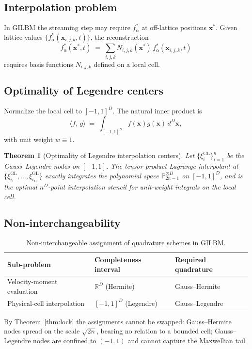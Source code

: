 \documentclass[11pt,a4paper]{article}
\newtheorem{theorem}{Theorem}[section]
\theoremstyle{definition}
\newcommand{\R}{\mathbb{R}}
\newcommand{\PP}{\mathbb{P}}
\newcommand{\ip}[2]{\langle #1,\, #2 \rangle}
\newcommand{\GL}{\mathrm{GL}}
\begin{document}
\subsection{Interpolation problem}

In GILBM the streaming step may require $f_\alpha^*$ at off-lattice positions
$\bm{x}^*$. Given lattice values $\{f_\alpha^*(\bm{x}_{i,j,k},t)\}$, the
reconstruction
\[
  f_\alpha^*(\bm{x}^*,t)
  \;=\;\sum_{i,j,k} N_{i,j,k}(\bm{x}^*)\,f_\alpha^*(\bm{x}_{i,j,k},t)
\]
requires basis functions $N_{i,j,k}$ defined on a local cell.

\subsection{Optimality of Legendre centers}

Normalize the local cell to $[-1,1]^D$. The natural inner product is
\[
  \ip{f}{g}\;=\;\int_{[-1,1]^D} f(\bm{x})g(\bm{x})\,d^D\bm{x},
\]
with unit weight $w\equiv 1$.

\begin{theorem}[Optimality of Legendre interpolation centers]\label{thm:GL-opt}
Let $\{\xi_i^{\GL}\}_{i=1}^n$ be the Gauss--Legendre nodes on $[-1,1]$. The
tensor-product Lagrange interpolant at
$\{\xi_{i_1}^{\GL},\ldots,\xi_{i_D}^{\GL}\}$ exactly integrates the polynomial
space $\PP_{2n-1}^{\otimes D}$ on $[-1,1]^D$, and is the optimal $n^D$-point
interpolation stencil for unit-weight integrals on the local cell.
\end{theorem}

\subsection{Non-interchangeability}

\begin{table}[ht]
\centering
\caption{Non-interchangeable assignment of quadrature schemes in GILBM.}
\label{tab:non-interch}
\begin{tabular}{lll}
\toprule
Sub-problem                 & Completeness interval & Required quadrature \\
\midrule
Velocity-moment evaluation  & $\R^D$ (Hermite)      & Gauss--Hermite \\
Physical-cell interpolation & $[-1,1]^D$ (Legendre) & Gauss--Legendre \\
\bottomrule
\end{tabular}
\end{table}

By Theorem~\ref{thm:lock} the assignments cannot be swapped: Gauss--Hermite
nodes spread on the scale $\sqrt{2n}$, bearing no relation to a bounded cell;
Gauss--Legendre nodes are confined to $(-1,1)$ and cannot capture the
Maxwellian tail.
\end{document}
